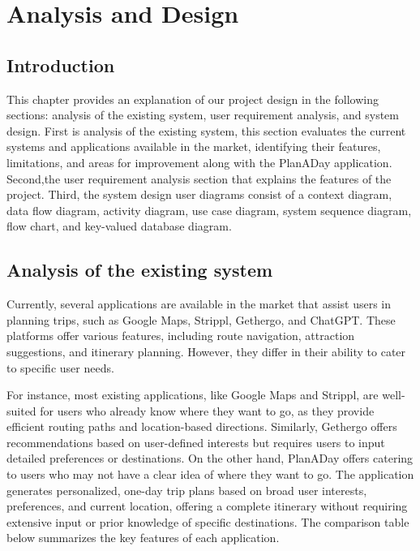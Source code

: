 \chapter{Analysis and Design}
\section{Introduction}
\par
This chapter provides an explanation of our project design in the following sections: analysis of
the existing system, user requirement analysis, and system design. First is analysis of the existing
system, this section evaluates the current systems and applications available in the market,
identifying their features, limitations, and areas for improvement along with the PlanADay
application. Second,the user requirement analysis section that explains the features of the project.
Third, the system design user diagrams consist of a context diagram, data flow diagram, activity
diagram, use case diagram, system sequence diagram, flow chart, and key-valued database
diagram.

\section{Analysis of the existing system}
Currently, several applications are available in the market that assist users in planning trips, such
as Google Maps, Strippl, Gethergo, and ChatGPT. These platforms offer various features,
including route navigation, attraction suggestions, and itinerary planning. However, they differ in
their ability to cater to specific user needs.
\par
For instance, most existing applications, like Google Maps and Strippl, are well-suited for users
who already know where they want to go, as they provide efficient routing paths and
location-based directions. Similarly, Gethergo offers recommendations based on user-defined
interests but requires users to input detailed preferences or destinations. On the other hand,
PlanADay offers catering to users who may not have a clear idea of where they want to go. The
application generates personalized, one-day trip plans based on broad user interests, preferences,
and current location, offering a complete itinerary without requiring extensive input or prior
knowledge of specific destinations. The comparison table below summarizes the key features of
each application.

